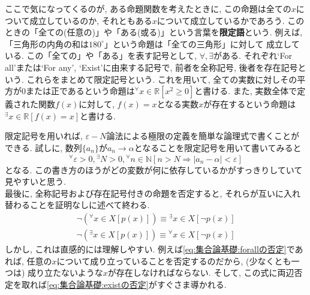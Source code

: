 \documentclass[a4j,dvipdfmx]{jsarticle}
\numberwithin{equation}{section}
\begin{document}
            ここで気になってくるのが, ある命題関数を考えたときに, この命題は全ての$x$について成立しているのか, それともある$x$について成立しているかであろう. 
            このときの「全ての(任意の)」や「ある(或る)」という言葉を\textbf{限定語}という. 例えば, 「三角形の内角の和は$180^\circ$」という命題は「全ての三角形」に対して
            成立している. この「全ての」や「ある」を表す記号として, $\forall,\exists$がある. それぞれ`For all'または`For any', `Exist'に由来する記号で, 
            前者を全称記号, 後者を存在記号という. これらをまとめて限定記号という. これを用いて, 全ての実数に対しその平方が0または正であるという命題は$^\forall x\in \mathbb{R} [x^2\geq 0]$と書ける.
            また, 実数全体で定義された関数$f(x)$に対して, $f(x)=x$となる実数$x$が存在するという命題は$^\exists x\in \mathbb{R}[f(x)=x]$と書ける.

            限定記号を用いれば, $\varepsilon-N$論法による極限の定義を簡単な論理式で書くことができる. 試しに, 数列$\{a_n\}$が$a_n\rightarrow \alpha$となることを限定記号を用いて書いてみると
            \begin{equation*}
                {}^\forall \varepsilon>0, {}^\exists N>0, {}^\forall n\in \mathbb{N} \left[n>N \Rightarrow |a_n-\alpha|<\varepsilon\right]
            \end{equation*}
            となる. この書き方のほうがどの変数が何に依存しているかがすっきりしていて見やすいと思う.\\

            最後に, 全称記号および存在記号付きの命題を否定すると, それらが互いに入れ替わることを証明なしに述べて終わる.
            \begin{align}
                \lnot\left({}^\forall x\in X \left[p(x)\right]\right) \equiv {}^\exists x\in X \left[\lnot p(x)\right] \label{eq:集合論基礎:forallの否定}\\
                \lnot\left({}^\exists x\in X \left[p(x)\right]\right) \equiv {}^\forall x\in X \left[\lnot p(x)\right] \label{eq:集合論基礎:existの否定}
            \end{align}
            しかし, これは直感的には理解しやすい. 例えば\eqref{eq:集合論基礎:forallの否定}であれば, 任意の$x$について成り立っていることを否定するのだから, (少なくとも一つは)
            成り立たないような$x$が存在しなければならない. そして, この式に両辺否定を取れば\eqref{eq:集合論基礎:existの否定}がすぐさま導かれる.
        \clearpage
\end{document}
